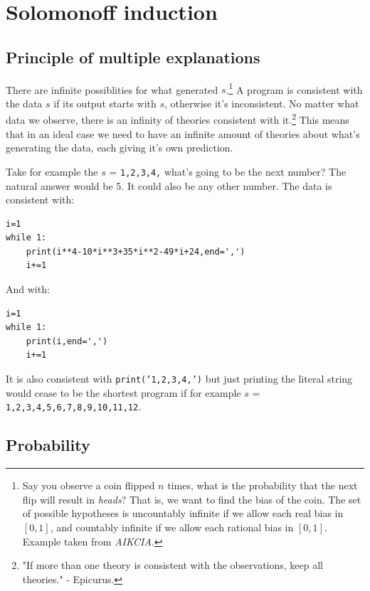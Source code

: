 \newpage

\section{Solomonoff induction}

\subsection{Principle of multiple explanations}

There are infinite possiblities for what generated $s$.\footnote{Say you observe a coin flipped $n$ times, what is the probability that the next flip will result in \textit{heads}? That is, we want to find the bias of the coin. The set of possible hypotheses is uncountably infinite if we allow each real bias in $[0, 1]$, and countably infinite if we allow each rational bias in $[0, 1]$. Example taken from \textit{AIKCIA}.}
A program is consistent with the data $s$ if its output starts with $s$, otherwise it's inconsistent.
No matter what data we observe, there is an infinity of theories consistent with it.\footnote{"If more than one theory is consistent with the observations, keep all theories." - Epicurus.}
This means that in an ideal case we need to have an infinite amount of theories about what's generating the data, each giving it's own prediction.

Take for example the $s$ = \texttt{1,2,3,4,} what's going to be the next number? The natural answer would be 5. It could also be any other number. The data is consistent with:

\begin{lstlisting}[caption={This gives us 29 as the next number}]
i=1
while 1:
	print(i**4-10*i**3+35*i**2-49*i+24,end=',')
	i+=1
\end{lstlisting}

And with:

\begin{lstlisting}[caption={This gives us 5 as the next number}]
i=1
while 1:
	print(i,end=',')
	i+=1
\end{lstlisting} %

It is also consistent with \texttt{print('1,2,3,4,')} but just printing the literal string would cease to be the shortest program if for example $s$ = \texttt{1,2,3,4,5,6,7,8,9,10,11,12}.

\newpage

\subsection{Probability}

